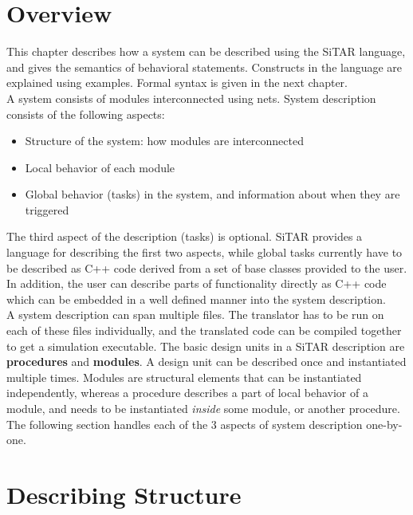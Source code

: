 
	\section{Overview}
	This chapter describes how a system can be described using the SiTAR
	language, and gives the semantics of behavioral statements.
	Constructs in the language are explained using examples. Formal syntax is 
	given in the next chapter.\\

	A system consists of modules interconnected using nets. 
	System description consists of the following aspects:
	\begin{itemize}
	\item Structure of the system: how modules are interconnected
	\item Local behavior of each module
	\item Global behavior (tasks) in the system, and information about when they are triggered
	\end{itemize}
	The third aspect of the description (tasks) is optional.  SiTAR
	provides a language for describing the first two aspects, while global
	tasks currently have to be described as C++ code derived from a set of
	base classes provided to the user.  In addition, the user can describe
	parts of functionality directly as C++ code which can be embedded in a
	well defined manner into the system description.\\

	
	A system description  can span multiple files. The translator has to be
	run on each of these files individually, and the translated code can be compiled together
	to get a simulation executable.
	The basic design units in a SiTAR description are \textbf{procedures} and \textbf{modules}.
	A design unit can be described once and instantiated multiple times.
	Modules are structural elements that can be instantiated independently, 
	whereas a procedure describes a part of local behavior of a module, 
	and needs to be instantiated \emph{inside} some module, or another procedure.
	The following section handles each of the 3 aspects of system description one-by-one.\\

	\section{Describing Structure}
	
